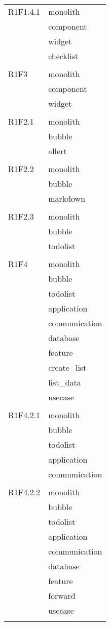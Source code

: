 \begin{center}
\begin{longtable}{|p{7cm}|p{5cm}|}
		R1F1.4.1 & monolith \\ & component \\ & widget \\ & checklist \\ & \\ \hline
		R1F3 & monolith \\ & component \\ & widget \\ & \\ \hline
		R1F2.1 & monolith \\ & bubble \\ & allert \\ & \\ \hline
		R1F2.2 & monolith \\ & bubble \\ & markdown \\ & \\ \hline
		R1F2.3 & monolith \\ & bubble \\ & todolist \\ & \\ \hline
		R1F4 & monolith \\ & bubble \\ & todolist \\ & application \\ & communication \\ & database \\ & feature \\ & create\_list \\ & list\_data \\ & usecase \\ & \\ \hline
		R1F4.2.1 & monolith \\ & bubble \\ & todolist \\ & application \\ & communication \\ & \\ \hline
		R1F4.2.2 & monolith \\ & bubble \\ & todolist \\ & application \\ & communication \\ & database \\ & feature \\ & forward \\ & usecase \\ & \\ \hline

\end{longtable}
\end{center}
